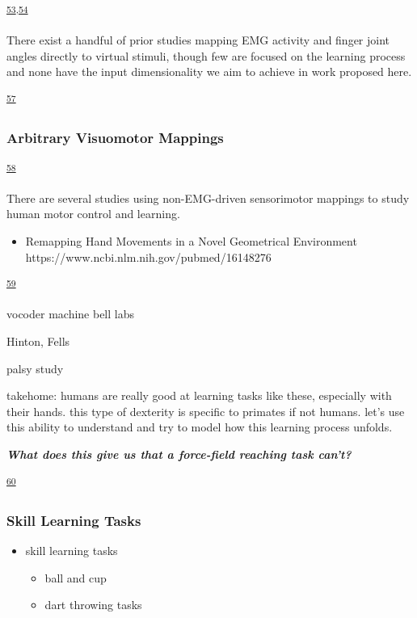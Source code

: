 \documentclass[
  a4paper,
]{article}
\providecommand{\tightlist}{%
  \setlength{\itemsep}{0pt}\setlength{\parskip}{0pt}}
\begin{document}
\textsuperscript{\protect\hyperlink{ref-Krakauer2019}{53},\protect\hyperlink{ref-Shadmehr2008}{54}}

There exist a handful of prior studies mapping EMG activity and finger
joint angles directly to virtual stimuli, though few are focused on the
learning process and none have the input dimensionality we aim to
achieve in work proposed here.

\textsuperscript{\protect\hyperlink{ref-vanbeersRandomWalkMotor2013}{57}}

\hypertarget{arbitrary-visuomotor-mappings}{%
\subsubsection{Arbitrary Visuomotor
Mappings}\label{arbitrary-visuomotor-mappings}}

\textsuperscript{\protect\hyperlink{ref-Mussa-IvaldiSensoryMotorRemapping2011}{58}}

There are several studies using non-EMG-driven sensorimotor mappings to
study human motor control and learning.

\begin{itemize}
\tightlist
\item
  Remapping Hand Movements in a Novel Geometrical Environment
  https://www.ncbi.nlm.nih.gov/pubmed/16148276
\end{itemize}

\textsuperscript{\protect\hyperlink{ref-MosierRemappingHandMovements2005}{59}}

vocoder machine bell labs

Hinton, Fells

palsy study

takehome: humans are really good at learning tasks like these,
especially with their hands. this type of dexterity is specific to
primates if not humans. let's use this ability to understand and try to
model how this learning process unfolds.

\textbf{\emph{What does this give us that a force-field reaching task
can't?}}

\textsuperscript{\protect\hyperlink{ref-nazarpourFlexibleCorticalControl2012}{60}}

\hypertarget{skill-learning-tasks}{%
\subsubsection{Skill Learning Tasks}\label{skill-learning-tasks}}

\begin{itemize}
\tightlist
\item
  skill learning tasks

  \begin{itemize}
  \tightlist
  \item
    ball and cup
  \item
    dart throwing tasks
  \end{itemize}
\end{itemize}
\end{document}
